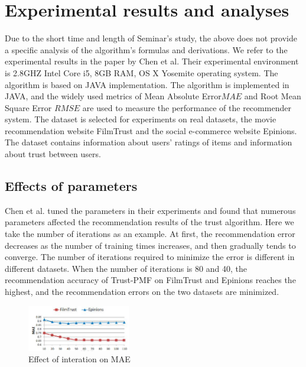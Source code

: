 \section{Experimental results and analyses}
Due to the short time and length of Seminar's study, the above does not provide a specific 
analysis of the algorithm's formulas and derivations. We refer to the experimental 
results in the paper by Chen et al.\cite{b15} Their experimental environment is 2.8GHZ Intel Core 
i5, 8GB RAM, OS X Yosemite operating system. The algorithm is based on JAVA implementation. 
The algorithm is implemented in JAVA, and the widely used metrics of Mean Absolute Error$MAE$ 
and Root Mean Square Error $RMSE$ are used to measure the performance of the recommender 
system. The dataset is selected for experiments on real datasets, the movie recommendation 
website FilmTrust and the social e-commerce website Epinions. The dataset contains 
information about users' ratings of items and information about trust between users\cite{b24}.

\subsection{Effects of parameters}
Chen et al.\cite{b15} tuned the parameters in their experiments and found that numerous parameters 
affected the recommendation results of the trust algorithm. Here we take the number 
of iterations as an example. At first, the recommendation error decreases as the number 
of training times increases, and then gradually tends to converge\cite{b23, b25}. The number of iterations 
required to minimize the error is different in different datasets. When the number of 
iterations is 80 and 40, the recommendation accuracy of Trust-PMF on FilmTrust and Epinions 
reaches the highest, and the recommendation errors on the two datasets are minimized\cite{b21}.

\begin{figure}[H] %
    \centering %
    \includegraphics[width=0.4\textwidth]{figures/parameter1.png} %
    \caption{Effect of interation on MAE} %
    \label{Fig.2: Effect of interation on MAE} %
    \end{figure}
 \\

